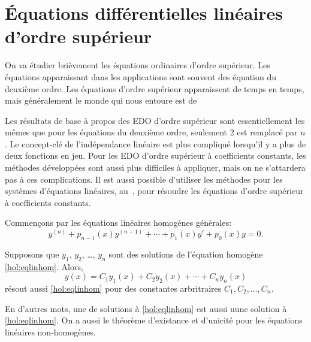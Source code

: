 \sectionnewpage
\section{Équations différentielles linéaires d'ordre supérieur} \label{sec:hol}


%

On va étudier brièvement les équations ordinaires d'ordre supérieur. Les équations apparaissant dans les applications sont souvent des équation du deuxième ordre. Les équations d'ordre supérieur apparaissent de temps en temps, mais généralement le monde qui nous entoure est de   

Les résultats de base à propos des EDO d'ordre supérieur sont essentiellement les mêmes que pour les équations du deuxième ordre, seulement 2 est remplacé par $n$.
Le concept-clé de l'indépendance linéaire est plus compliqué lorsqu'il y a plus de deux fonctions en jeu. Pour les EDO d'ordre supérieur à coefficients constants, les méthodes développées sont aussi plus difficiles à appliquer, mais on ne s'attardera pas à ces complications. Il est aussi possible d'utiliser les méthodes pour les systèmes d'équations linéaires, au~, pour résoudre les équations d'ordre supérieur à coefficients constants. 

Commençons par les équations linéaires homogènes générales: 
\begin{equation} \label{hol:eqlinhom}
	y^{(n)} + p_{n-1}(x)y^{(n-1)} + \cdots + p_1(x) y' + p_0(x) y = 0 .
\end{equation}

\begin{theorem}[Superposition]
	Supposons que $y_1$, $y_2$, \ldots, $y_n$ sont des solutions de l'équation homogène \eqref{hol:eqlinhom}.  
	Alors, 
	\begin{equation*}
		y(x) = C_1 y_1(x) + C_2 y_2(x) + \cdots + C_n y_n(x) 
	\end{equation*}
	résout aussi \eqref{hol:eqlinhom} pour des constantes arbritraires $C_1, C_2, \ldots, C_n$.
\end{theorem}

En d'autres mots, une \emph{} de solutions à \eqref{hol:eqlinhom}
est aussi uune solution à \eqref{hol:eqlinhom}.
On a aussi le théorème d'existance et d'unicité pour les équations linéaires non-homogènes. 


